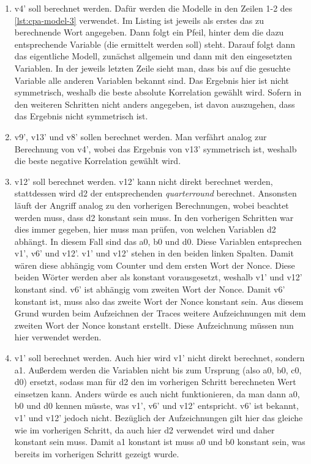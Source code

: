 \documentclass[a4paper,ngerman]{scrreprt}
\begin{document}
\begin{enumerate}
    \item v4' soll berechnet werden. Dafür werden die Modelle in den Zeilen 1-2
        des \autoref{lst:cpa-model-3} verwendet. Im Listing ist jeweils als
        erstes das zu berechnende Wort angegeben. Dann folgt ein Pfeil, hinter
        dem die dazu entsprechende Variable (die ermittelt werden soll) steht.
        Darauf folgt dann das eigentliche Modell, zunächst allgemein und dann
        mit den eingesetzten Variablen. In der jeweils letzten Zeile sieht man,
        dass bis auf die gesuchte Variable alle anderen Variablen bekannt sind.
        Das Ergebnis hier ist nicht symmetrisch, weshalb die beste absolute
        Korrelation gewählt wird. Sofern in den weiteren Schritten nicht anders
        angegeben, ist davon auszugehen, dass das Ergebnis nicht symmetrisch
        ist.

    \item v9', v13' und v8' sollen berechnet werden. Man verfährt analog zur
        Berechnung von v4', wobei das Ergebnis von v13' symmetrisch ist, weshalb
        die beste negative Korrelation gewählt wird.

    \item v12' soll berechnet werden. v12' kann nicht direkt berechnet werden,
        stattdessen wird d2 der entsprechenden \emph{quarterround} berechnet.
        Ansonsten läuft der Angriff analog zu den vorherigen Berechnungen, wobei
        beachtet werden muss, dass d2 konstant sein muss. In den vorherigen
        Schritten war dies immer gegeben, hier muss man prüfen, von welchen
        Variablen d2 abhängt. In diesem Fall sind das a0, b0 und d0. Diese
        Variablen entsprechen v1', v6' und v12'. v1' und v12' stehen in den
        beiden linken Spalten. Damit wären diese abhängig vom Counter und dem
        ersten Wort der Nonce. Diese beiden Wörter werden aber als konstant
        vorausgesetzt, weshalb v1' und v12' konstant sind. v6' ist abhängig vom
        zweiten Wort der Nonce. Damit v6' konstant ist, muss also das zweite
        Wort der Nonce konstant sein. Aus diesem Grund wurden beim Aufzeichnen
        der Traces weitere Aufzeichnungen mit dem zweiten Wort der Nonce
        konstant erstellt. Diese Aufzeichnung müssen nun hier verwendet werden.

    \item v1' soll berechnet werden. Auch hier wird v1' nicht direkt berechnet,
        sondern a1. Außerdem werden die Variablen nicht bis zum Ursprung (also
        a0, b0, c0, d0) ersetzt, sodass man für d2 den im vorherigen Schritt
        berechneten Wert einsetzen kann. Anders würde es auch nicht
        funktionieren, da man dann a0, b0 und d0 kennen müsste, was v1', v6' und
        v12' entspricht. v6' ist bekannt, v1' und v12' jedoch nicht. Bezüglich
        der Aufzeichnungen gilt hier das gleiche wie im vorherigen Schritt, da
        auch hier d2 verwendet wird und daher konstant sein muss. Damit a1
        konstant ist muss a0 und b0 konstant sein, was bereits im vorherigen
        Schritt gezeigt wurde.
    \label{itm:calc-v1}


\end{enumerate}
\end{document}
